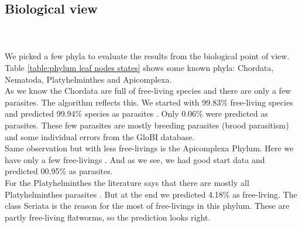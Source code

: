     \subsection{Biological view}
    

       \\ \\

      We picked a few phyla to evaluate the results from the biological point of view. \\
      Table \ref{table:phylum leaf nodes states} shows some known phyla: Chordata, Nematoda, 
        Platyhelminthes and Apicomplexa. \\
      As we know  the Chordata are full of free-living species and there are only a 
        few parasites. The algorithm reflects this. We started with 99.83\% free-living species and 
        predicted 99.94\% species as parasites . Only 0.06\% were 
        predicted as parasites. These few parasites are mostly breeding parasites (brood parasitism) and 
        some individual errors from the GloBI database. \\
      Same observation but with less free-livings is the Apicomplexa Phylum. Here we have only a few 
        free-livings . And as we see, we had good start data and predicted 00.95\% as 
        parasites. \\
      For the Platyhelminthes the literature says that there are mostly all Platyhelminthes parasites
        . But at the end we predicted 4.18\% as free-living. The class Seriata is the 
        reason for the most of free-livings in this phylum. These are partly free-living flatworms, so 
        the prediction looks right. \\
      
